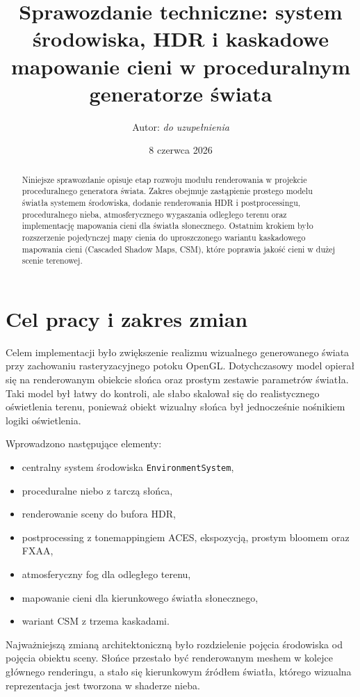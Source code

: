 \documentclass[12pt,a4paper]{article}
\title{Sprawozdanie techniczne: system środowiska, HDR i kaskadowe mapowanie cieni w proceduralnym generatorze świata}
\author{Autor: \textit{do uzupełnienia}}
\date{8 czerwca 2026}
\begin{document}
\maketitle

\begin{abstract}
Niniejsze sprawozdanie opisuje etap rozwoju modułu renderowania w projekcie proceduralnego generatora świata. Zakres obejmuje zastąpienie prostego modelu światła systemem środowiska, dodanie renderowania HDR i postprocessingu, proceduralnego nieba, atmosferycznego wygaszania odległego terenu oraz implementację mapowania cieni dla światła słonecznego. Ostatnim krokiem było rozszerzenie pojedynczej mapy cienia do uproszczonego wariantu kaskadowego mapowania cieni (Cascaded Shadow Maps, CSM), które poprawia jakość cieni w dużej scenie terenowej.
\end{abstract}

\tableofcontents
\newpage

\section{Cel pracy i zakres zmian}

Celem implementacji było zwiększenie realizmu wizualnego generowanego świata przy zachowaniu rasteryzacyjnego potoku OpenGL. Dotychczasowy model opierał się na renderowanym obiekcie słońca oraz prostym zestawie parametrów światła. Taki model był łatwy do kontroli, ale słabo skalował się do realistycznego oświetlenia terenu, ponieważ obiekt wizualny słońca był jednocześnie nośnikiem logiki oświetlenia.

Wprowadzono następujące elementy:

\begin{itemize}
    \item centralny system środowiska \texttt{EnvironmentSystem},
    \item proceduralne niebo z tarczą słońca,
    \item renderowanie sceny do bufora HDR,
    \item postprocessing z tonemappingiem ACES, ekspozycją, prostym bloomem oraz FXAA,
    \item atmosferyczny fog dla odległego terenu,
    \item mapowanie cieni dla kierunkowego światła słonecznego,
    \item wariant CSM z trzema kaskadami.
\end{itemize}

Najważniejszą zmianą architektoniczną było rozdzielenie pojęcia środowiska od pojęcia obiektu sceny. Słońce przestało być renderowanym meshem w kolejce głównego renderingu, a stało się kierunkowym źródłem światła, którego wizualna reprezentacja jest tworzona w shaderze nieba.
\end{document}
